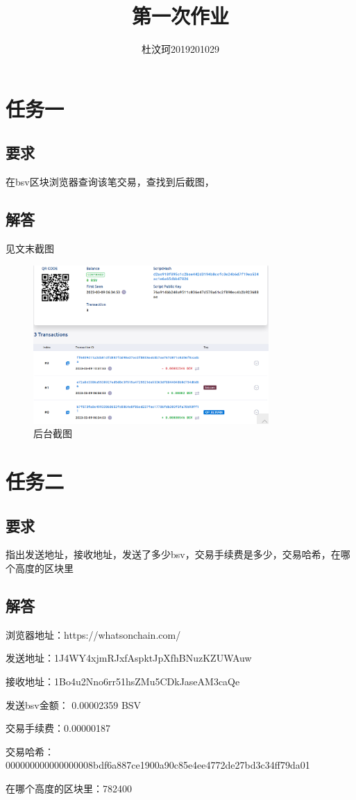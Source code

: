 \documentclass{article}
\title{第一次作业}
\author{杜汶珂2019201029}
\begin{document}
\maketitle



\section{任务一}
\subsection{要求}
在bsv区块浏览器查询该笔交易，查找到后截图，

\subsection{解答}
见文末截图
\begin{figure}
\centering
\includegraphics[width=0.8\textwidth,height=0.5\textwidth]{screenshot.png}
\caption{后台截图} \label{fig1}
\end{figure}


\section{任务二}
\subsection{要求}
指出发送地址，接收地址，发送了多少bsv，交易手续费是多少，交易哈希，在哪个高度的区块里
\subsection{解答}
浏览器地址：https://whatsonchain.com/
\par
发送地址：1J4WY4xjmRJxfAspktJpXfhBNuzKZUWAuw
\par
接收地址：1Bo4u2Nno6rr51hsZMu5CDkJaseAM3caQe
\par
发送bsv金额： 0.00002359 BSV
\par
交易手续费：0.00000187
\par
交易哈希：000000000000000008bdf6a887ce1900a90c85e4ee4772de27bd3c34ff79da01
\par
在哪个高度的区块里：782400
\end{document}
